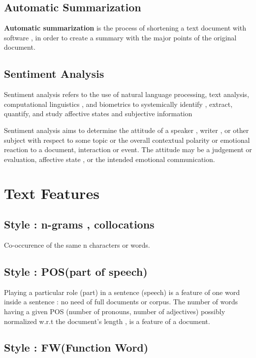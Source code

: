 \documentclass{article}
\begin{document}
\subsection{Automatic Summarization}

\textbf{Automatic summarization} is the process of shortening a text document with software , in order to create a summary with the major points of the original document.

\subsection{Sentiment Analysis}

Sentiment analysis refers to the use of natural language processing, text analysis, computational linguistics , and biometrics to systemically identify , extract, quantify, and study affective states and subjective information

Sentiment analysis aims to determine the attitude of a speaker , writer , or other subject with respect to some topic or the overall contextual polarity or emotional reaction to a document, interaction or event. The attitude may be a judgement or evaluation, affective state , or the intended emotional communication.

\section{Text Features}

\subsection{Style : n-grams , collocations}

Co-occurence of the same n characters or words.

\subsection{Style : POS(part of speech)}

Playing a particular role (part) in a sentence (speech) is a feature of one word inside a sentence : no need of full documents or corpus.
The number of words having a given POS (number of pronouns, number of adjectives) possibly normalized w.r.t the document's length , is a feature of a document.

\subsection{Style : FW(Function Word)}
\end{document}
